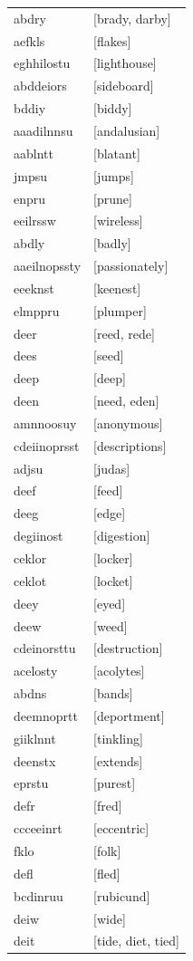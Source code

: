 \documentclass{article}
\begin{document}
\begin{tabular}{ll}
abdry & [brady, darby] \\
aefkls & [flakes] \\
eghhilostu & [lighthouse] \\
abddeiors & [sideboard] \\
bddiy & [biddy] \\
aaadilnnsu & [andalusian] \\
aablntt & [blatant] \\
jmpsu & [jumps] \\
enpru & [prune] \\
eeilrssw & [wireless] \\
abdly & [badly] \\
aaeilnopssty & [passionately] \\
eeeknst & [keenest] \\
elmppru & [plumper] \\
deer & [reed, rede] \\
dees & [seed] \\
deep & [deep] \\
deen & [need, eden] \\
amnnoosuy & [anonymous] \\
cdeiinoprsst & [descriptions] \\
adjsu & [judas] \\
deef & [feed] \\
deeg & [edge] \\
degiinost & [digestion] \\
ceklor & [locker] \\
ceklot & [locket] \\
deey & [eyed] \\
deew & [weed] \\
cdeinorsttu & [destruction] \\
acelosty & [acolytes] \\
abdns & [bands] \\
deemnoprtt & [deportment] \\
giiklnnt & [tinkling] \\
deenstx & [extends] \\
eprstu & [purest] \\
defr & [fred] \\
ccceeinrt & [eccentric] \\
fklo & [folk] \\
defl & [fled] \\
bcdinruu & [rubicund] \\
deiw & [wide] \\
deit & [tide, diet, tied] \\

\end{tabular}
\end{document}
